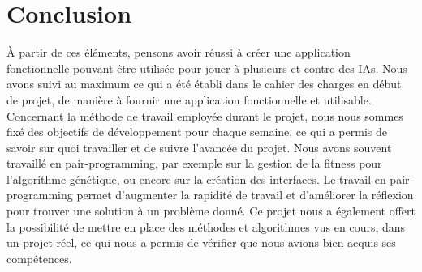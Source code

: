 \section{Conclusion}

À partir de ces éléments, pensons avoir réussi à créer une application fonctionnelle pouvant être utilisée pour jouer à plusieurs et contre des IAs. Nous avons suivi au maximum ce qui a été établi dans le cahier des charges en début de projet, de manière à fournir une application fonctionnelle et utilisable. 
Concernant la méthode de travail employée durant le projet, nous nous sommes fixé des objectifs de développement pour chaque semaine, ce qui a permis de savoir sur quoi travailler et de suivre l'avancée du projet. Nous avons souvent travaillé en pair-programming, par exemple sur la gestion de la fitness pour l'algorithme génétique, ou encore sur la création des interfaces.
Le travail en pair-programming permet d'augmenter la rapidité de travail et d'améliorer la réflexion pour trouver une solution à un problème donné.
Ce projet nous a également offert la possibilité de mettre en place des méthodes et algorithmes vus en cours, dans un projet réel, ce qui nous a permis de vérifier que nous avions bien acquis ses compétences.